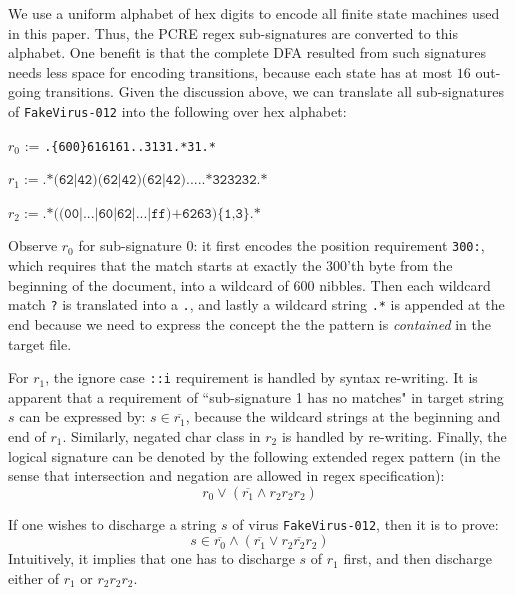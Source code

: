 We use a uniform alphabet of hex digits to encode all finite state machines
used in this paper. Thus, the PCRE regex sub-signatures are converted to
this alphabet. One benefit is that the complete DFA resulted from such signatures
needs less space for encoding transitions, because each state has at most
$16$ out-going transitions.  Given the discussion above, we can translate
all sub-signatures of \texttt{FakeVirus-012} into the following over
hex alphabet:

\begin{small}
$r_0$ := \texttt{.\{600\}616161..3131.*31.*}
\end{small}

\begin{small}
$r_1 := \texttt{.*(62|42)(62|42)(62|42).....*323232.*}$
\end{small}

\begin{small}
$r_2 := \texttt{.*((00|...|60|62|...|ff)+6263)\{1,3\}.*}$
\end{small}

Observe $r_0$ for sub-signature $0$: 
it first encodes the position requirement
\texttt{300:}, which requires that the match starts
at exactly the $300$'th byte from the beginning of the
document, into a wildcard of $600$ nibbles. Then each
wildcard match \texttt{?} is translated into a \texttt{.},
and lastly a wildcard string \texttt{.*} is appended at the
end because we need to express the concept the the
pattern is {\em contained} in the target file.

For $r_1$, the ignore case \texttt{::i} requirement is
handled by syntax re-writing. It is apparent that a requirement
of ``sub-signature 1 has no matches" in target string $s$
can be expressed by: $s \in \overline{r_1}$, because the wildcard
strings at the beginning and end of $r_1$.
Similarly, negated char class in $r_2$ is handled by
re-writing. Finally, the logical signature can be
denoted by the following extended regex pattern (in the sense
that intersection and negation are allowed in regex specification):
\[
	r_0 \vee (\overline{r_1} \wedge r_2r_2r_2)
\]

If one wishes to discharge a string $s$ of virus \texttt{FakeVirus-012},
then it is to prove:
\[
	s \in \overline{r_0} \wedge (\overline{r_1} \vee \overline{r_2r_2r_2})
\]
Intuitively, it implies that one has to discharge $s$ 
of $r_1$ first, and then discharge either of $r_1$ or
$r_2r_2r_2$.

